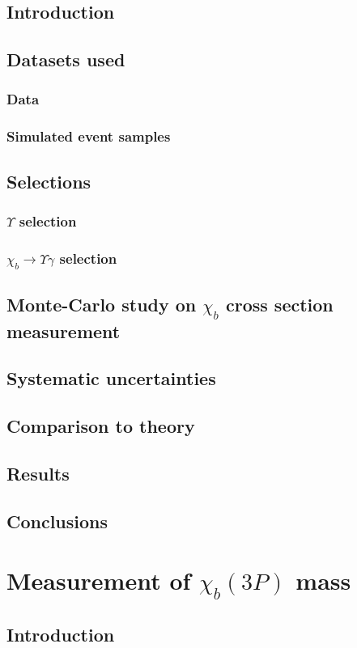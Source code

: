 \documentclass[12pt, a4paper]{article}
\begin{document}
\subsection{Introduction}
\subsection{Datasets used}
\subsubsection{Data}
\subsubsection{Simulated event samples}
\subsection{Selections}
\subsubsection{$\Upsilon$ selection}
\subsubsection{$\chi_{b} \rightarrow \Upsilon \gamma$ selection}
\subsection{Monte-Carlo study on $\chi_b$ cross section measurement}
\subsection{Systematic uncertainties}
\subsection{Comparison to theory}
\subsection{Results}
\subsection{Conclusions}


\section{Measurement of $\chi_{b}(3P)$ mass}
\subsection{Introduction}
\end{document}
